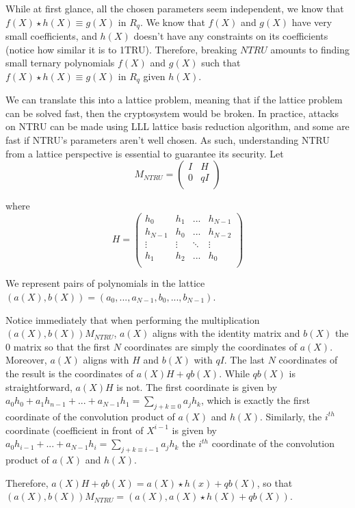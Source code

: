\documentclass[12pt]{article}
\theoremstyle{definition}
\theoremstyle{proposition}
\theoremstyle{remark}
\theoremstyle{theorem}
\theoremstyle{example}
\begin{document}
While at first glance, all the chosen parameters seem independent, we know that $f(X) \star h(X) \equiv g(X)$ in $R_q$. We know that $f(X)$ and $g(X)$ have very small coefficients, and $h(X)$ doesn't have any constraints on its coefficients (notice how similar it is to 1TRU). Therefore, breaking $NTRU$ amounts to finding small ternary polynomials $f(X)$ and $g(X)$ such that $f(X) \star h(X) \equiv g(X)$ in $R_q$ given $h(X)$.

We can translate this into a lattice problem, meaning that if the lattice problem can be solved fast, then the cryptosystem would be broken. In practice, attacks on NTRU can be made using LLL lattice basis reduction algorithm, and some are fast if NTRU's parameters aren't well chosen. As such, understanding NTRU from a lattice perspective is essential to guarantee its security. Let $$M_{NTRU} =  \begin{pmatrix}
I & H \\
0 & qI \\
\end{pmatrix}$$

where $$H = \begin{pmatrix}
h_0 & h_1 & ... & h_{N-1} \\
h_{N-1} & h_0 & ... & h_{N-2} \\
\vdots & \vdots & \ddots & \vdots \\
h_1 & h_2 & ... & h_0 \\
\end{pmatrix} $$

We represent pairs of polynomials in the lattice $(a(X),b(X)) = (a_0,...,a_{N-1},b_0,..., b_{N-1})$. 

Notice immediately that when performing the multiplication $(a(X),b(X))M_{NTRU}$, $a(X)$ aligns with the identity matrix and $b(X)$ the $0$ matrix so that the first $N$ coordinates are simply the coordinates of $a(X)$. Moreover, $a(X)$ aligns with $H$ and $b(X)$ with $qI$. The last $N$ coordinates of the result is the coordinates of $a(X)H + qb(X)$. While $qb(X)$ is straightforward, $a(X)H$ is not. The first coordinate is given by $a_0h_0 + a_1h_{n-1} + ... + a_{N-1}h_1 = \sum_{j+k \equiv 0}a_jh_k$, which is exactly the first coordinate of the convolution product of $a(X)$ and $h(X)$. Similarly, the $i^{th}$ coordinate (coefficient in front of $X^{i-1}$ is given by $a_{0}h_{i-1} + ... + a_{N-1}h_{i} = \sum_{j+k \equiv i-1}a_jh_k$ the $i^{th}$ coordinate of the convolution product of $a(X)$ and $h(X)$. 

Therefore, $a(X)H + qb(X) = a(X) \star h(x) + qb(X)$, so that $(a(X),b(X))M_{NTRU} = (a(X), a(X) \star h(X) + qb(X))$.
\end{document}
